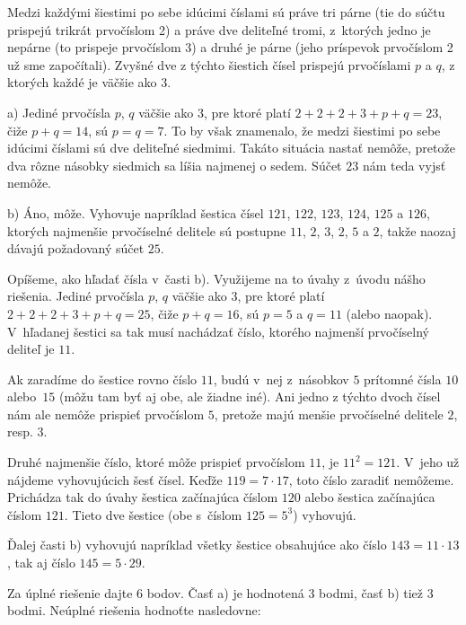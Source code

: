 {%
Medzi každými šiestimi po sebe idúcimi číslami sú práve tri párne (tie
do súčtu prispejú trikrát prvočíslom 2) a práve dve deliteľné tromi,
z~ktorých jedno je nepárne (to prispeje prvočíslom 3) a
druhé je párne (jeho príspevok prvočíslom 2 už sme započítali).
Zvyšné dve z týchto šiestich čísel prispejú prvočíslami $p$ a $q$,
z ktorých každé je väčšie ako 3.

a) Jediné prvočísla $p$, $q$ väčšie ako 3, pre ktoré platí
$2+2+2+3+p+q=23$, čiže $p+q=14$, sú $p=q=7$.
To by však znamenalo, že medzi šiestimi po sebe idúcimi číslami
sú dve deliteľné siedmimi. Takáto situácia nastať nemôže,
pretože dva rôzne násobky siedmich sa líšia najmenej o sedem.
Súčet $23$ nám teda vyjsť nemôže.

b) Áno, môže. Vyhovuje napríklad šestica čísel
$121$, $122$, $123$, $124$, $125$ a $126$,
ktorých najmenšie prvočíselné delitele sú postupne
$11$, $2$, $3$, $2$, $5$ a $2$, takže naozaj
dávajú požadovaný súčet $25$.

\poznamka
Opíšeme, ako hľadať čísla v~časti b). Využijeme na to
úvahy z~úvodu nášho riešenia. Jediné prvočísla $p$, $q$ väčšie ako 3,
pre ktoré platí $2+2+2+3+p+q=25$, čiže $p+q=16$, sú $p=5$ a $q=11$
(alebo naopak). V~hľadanej šestici sa tak musí nachádzať číslo,
ktorého najmenší prvočíselný deliteľ je $11$.

Ak zaradíme do šestice rovno číslo $11$, budú v~nej
z~násobkov $5$ prítomné čísla $10$ alebo~$15$
(môžu tam byť aj obe, ale žiadne iné). Ani jedno z týchto dvoch čísel
nám ale nemôže prispieť prvočíslom $5$, pretože majú
menšie prvočíselné delitele $2$, resp. $3$.

Druhé najmenšie číslo, ktoré môže prispieť prvočíslom $11$,
je $11^2=121$. V~jeho  už nájdeme vyhovujúcich
šesť čísel. Keďže $119=7\cdot17$, toto číslo zaradiť
nemôžeme. Prichádza tak do úvahy šestica začínajúca číslom $120$
alebo šestica začínajúca číslom $121$. Tieto dve šestice (obe
s~číslom $125=5^3$) vyhovujú.

Ďalej časti b) vyhovujú napríklad všetky šestice obsahujúce
ako číslo $143=11\cdot13$, tak aj číslo $145=5\cdot29$.


\schemaABC
Za úplné riešenie dajte 6 bodov. Časť a) je hodnotená 3 bodmi,
časť b) tiež 3 bodmi. Neúplné riešenia hodnoťte nasledovne:

}

